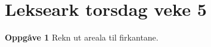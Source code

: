 


\section*{Lekseark torsdag veke 5}

\textbf{Oppgåve 1} \os
Rekn ut areala til firkantane.	
\begin{figure}
	\qquad
{}\qquad
{}
\end{figure}\vsk


